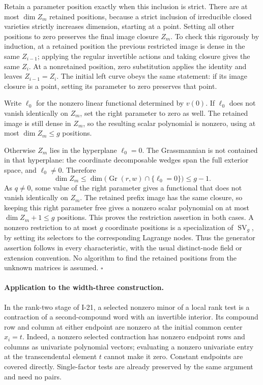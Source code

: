 \documentclass[11pt,a4paper]{article}
\theoremstyle{definition}\newtheorem{definition}{Definition}
\begin{document}
Retain a parameter position exactly when this inclusion is
strict.  There are at most $\dim Z_m$ retained positions,
because a strict inclusion of irreducible closed varieties
strictly increases dimension, starting at a point.
Setting all other positions to zero preserves the final
image closure $Z_m$.  To check this rigorously by induction,
at a retained position the previous restricted image is
dense in the same $Z_{i-1}$; applying the regular invertible
actions and taking closure gives the same $Z_i$.  At a
nonretained position, zero substitution applies the identity
and leaves $Z_{i-1}=Z_i$.  The initial left curve obeys the
same statement: if its image closure is a point, setting its
parameter to zero preserves that point.

Write $\ell_0$ for the nonzero linear functional determined
by $v(0)$.  If $\ell_0$ does not vanish identically on $Z_m$,
set the right parameter to zero as well.  The retained image
is still dense in $Z_m$, so the resulting scalar polynomial
is nonzero, using at most $\dim Z_m\le g$ positions.

Otherwise $Z_m$ lies in the hyperplane $\ell_0=0$.
The Grassmannian is not contained in that hyperplane:
the coordinate decomposable wedges span the full exterior
space, and $\ell_0\ne0$.  Therefore
\[
 \dim Z_m\le \dim\bigl(\operatorname{Gr}(r,w)
                                  \cap\{\ell_0=0\}\bigr)\le g-1.
\]
As $q\ne0$, some value of the right parameter gives a
functional that does not vanish identically on $Z_m$.
The retained prefix image has the same closure, so keeping
this right parameter free gives a nonzero scalar polynomial
on at most $\dim Z_m+1\le g$ positions.  This proves the
restriction assertion in both cases.  A nonzero restriction
to at most $g$ coordinate positions is a specialization of
$\operatorname{SV}_g$, by setting its selectors to the
corresponding Lagrange nodes.  Thus the generator assertion
follows in every characteristic, with the usual distinct-node
field or extension convention.  No algorithm to find the
retained positions from the unknown matrices is assumed.
\hfill$\square$

\paragraph{Application to the width-three construction.}
In the rank-two stage of I-21, a selected nonzero minor of
a local rank test is a contraction of a second-compound
word with an invertible interior.  Its compound row and
column at either endpoint are nonzero at the initial common
center $x_i=t$.  Indeed, a nonzero selected contraction has
nonzero endpoint rows and columns as univariate polynomial
vectors; evaluating a nonzero univariate entry at the
transcendental element $t$ cannot make it zero.  Constant
endpoints are covered directly.  Single-factor tests are
already preserved by the same argument and need no pairs.
\end{document}
